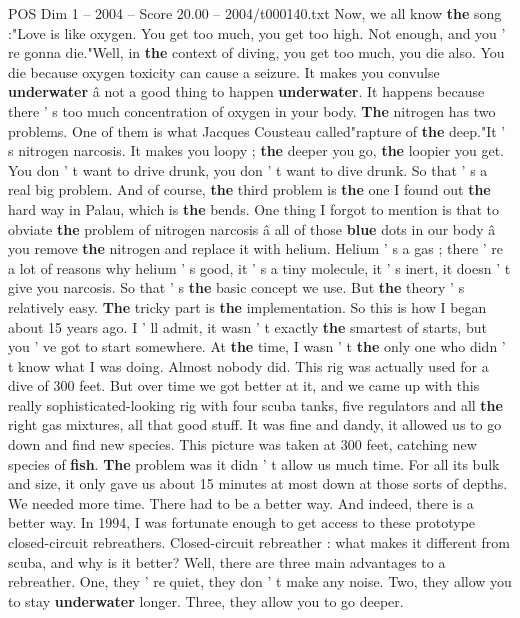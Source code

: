 \begin{textsample}{POS Dim 1 – 2004 – Score 20.00 – 2004/t000140.txt}
Now, we all know \textbf{the} song :"Love is like oxygen.
You get too much, you get too high.
Not enough, and you ' re gonna die."Well, in \textbf{the} context of diving, you get too much, you die also.
You die because oxygen toxicity can cause a seizure.
It makes you convulse \textbf{underwater} â not a good thing to happen \textbf{underwater}.
It happens because there ' s too much concentration of oxygen in your body. \textbf{The} nitrogen has two problems.
One of them is what Jacques Cousteau called"rapture of \textbf{the} deep."It ' s nitrogen narcosis.
It makes you loopy ; \textbf{the} deeper you go, \textbf{the} loopier you get.
You don ' t want to drive drunk, you don ' t want to dive drunk.
So that ' s a real big problem.
And of course, \textbf{the} third problem is \textbf{the} one I found out \textbf{the} hard way in Palau, which is \textbf{the} bends.
One thing I forgot to mention is that to obviate \textbf{the} problem of nitrogen narcosis â all of those \textbf{blue} dots in our body â you remove \textbf{the} nitrogen and replace it with helium.
Helium ' s a gas ; there ' re a lot of reasons why helium ' s good, it ' s a tiny molecule, it ' s inert, it doesn ' t give you narcosis.
So that ' s \textbf{the} basic concept we use.
But \textbf{the} theory ' s relatively easy. \textbf{The} tricky part is \textbf{the} implementation.
So this is how I began about 15 years ago.
I ' ll admit, it wasn ' t exactly \textbf{the} smartest of starts, but you ' ve got to start somewhere.
At \textbf{the} time, I wasn ' t \textbf{the} only one who didn ' t know what I was doing.
Almost nobody did.
This rig was actually used for a dive of 300 feet.
But over time we got better at it, and we came up with this really sophisticated-looking rig with four scuba tanks, five regulators and all \textbf{the} right gas mixtures, all that good stuff.
It was fine and dandy, it allowed us to go down and find new species.
This picture was taken at 300 feet, catching new species of \textbf{fish}. \textbf{The} problem was it didn ' t allow us much time.
For all its bulk and size, it only gave us about 15 minutes at most down at those sorts of depths.
We needed more time.
There had to be a better way.
And indeed, there is a better way.
In 1994, I was fortunate enough to get access to these prototype closed-circuit rebreathers.
Closed-circuit rebreather : what makes it different from scuba, and why is it better?
Well, there are three main advantages to a rebreather.
One, they ' re quiet, they don ' t make any noise.
Two, they allow you to stay \textbf{underwater} longer.
Three, they allow you to go deeper.

\end{textsample}
